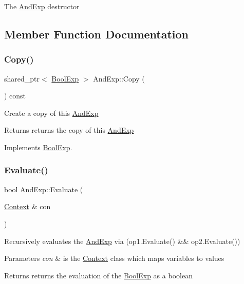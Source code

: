 The \mbox{\hyperlink{classAndExp}{And\+Exp}} destructor 

\subsection{Member Function Documentation}
\mbox{\label{classAndExp_a86a369f7f3bf7d4d157b9f0df9e6a315}} 
\subsubsection{\texorpdfstring{Copy()}{Copy()}}
{\footnotesize\ttfamily shared\+\_\+ptr$<$ \mbox{\hyperlink{classBoolExp}{Bool\+Exp}} $>$ And\+Exp\+::\+Copy (\begin{DoxyParamCaption}{ }\end{DoxyParamCaption}) const\hspace{0.3cm}{\ttfamily [virtual]}}

Create a copy of this \mbox{\hyperlink{classAndExp}{And\+Exp}} \begin{DoxyReturn}{Returns}
returns the copy of this \mbox{\hyperlink{classAndExp}{And\+Exp}} 
\end{DoxyReturn}


Implements \mbox{\hyperlink{classBoolExp_a846c30d1730cf645a040978a4cf7cdbb}{Bool\+Exp}}.

\mbox{\label{classAndExp_a7708cad60cf9b0913d30a7164ed8aceb}} 
\subsubsection{\texorpdfstring{Evaluate()}{Evaluate()}}
{\footnotesize\ttfamily bool And\+Exp\+::\+Evaluate (\begin{DoxyParamCaption}\item[{\mbox{\hyperlink{classContext}{Context}} \&}]{con }\end{DoxyParamCaption})\hspace{0.3cm}{\ttfamily [virtual]}}

Recursively evaluates the \mbox{\hyperlink{classAndExp}{And\+Exp}} via (op1.\+Evaluate() \&\& op2.\+Evaluate()) 
\begin{DoxyParams}{Parameters}
{\em con} & is the \mbox{\hyperlink{classContext}{Context}} class which maps variables to values \\
\hline
\end{DoxyParams}
\begin{DoxyReturn}{Returns}
returns the evaluation of the \mbox{\hyperlink{classBoolExp}{Bool\+Exp}} as a boolean 
\end{DoxyReturn}


